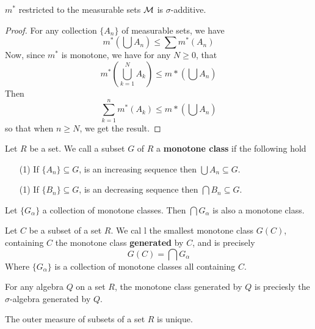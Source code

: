 \begin{corollary}
    $m^*$ restricted to the measurable sets $\mathcal{M}$ is $\sigma$-additive.
\end{corollary}
\begin{proof}
    For any collection $\{A_n\}$ of measurable sets, we have
    \begin{equation*}
        m^*(\bigcup{A_n}) \leq \sum{m^*(A_n)}
    \end{equation*}
    Now, since $m^*$ is monotone, we have for any  $N \geq 0$, that
    \begin{equation*}
        m^*(\bigcup_{k=1}^N{A_k}) \leq m*(\bigcup{A_n})
    \end{equation*}
    Then
    \begin{equation*}
        \sum_{k=1}^n{m^*(A_k)} \leq m*(\bigcup{A_n})
    \end{equation*}
    so that when $n \geq N$, we get the result.
\end{proof}

\begin{definition}
    Let $R$ be a set. We call a subset $G$ of  $R$ a  \textbf{monotone class} if
    the following hold
    \begin{enumerate}
        \item[(1)] If $\{A_n\} \subseteq G$, is an increasing sequence then
            $\bigcup{A_n} \subseteq G$.

        \item[(1)] If $\{B_n\} \subseteq G$, is an decreasing sequence then
            $\bigcap{B_n} \subseteq G$.
    \end{enumerate}
\end{definition}

\begin{lemma}\label{lemma_12}
    Let $\{G_\alpha\}$ a collection of monotone classes. Then
    $\bigcap{G_\alpha}$ is also a monotone class.
\end{lemma}

\begin{definition}
    Let $C$ be a subset of a set  $R$. We cal l the smallest monotone class
    $G(C)$, containing $C$ the monotone class  \textbf{generated} by $C$, and is
    precisely
    \begin{equation*}
        G(C)=\bigcap{G_\alpha}
    \end{equation*}
    Where $\{G_\alpha\}$ is a collection of monotone classes all containing $C$.
\end{definition}

\begin{lemma}\label{lemma_13}
    For any algebra $Q$ on a set  $R$, the monotone class generated by  $Q$ is
    preciesly the $\sigma$-algebra generated by $Q$.
\end{lemma}

\begin{theorem}\label{theorem_14}
    The outer measure of subsets of a set $R$ is unique.
\end{theorem}
